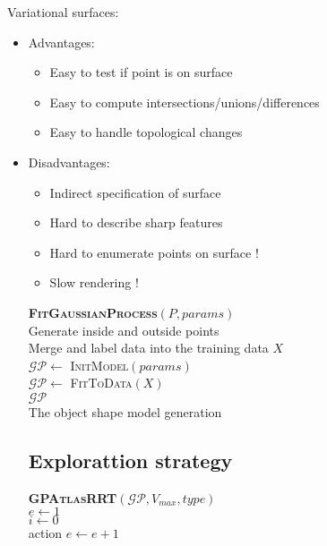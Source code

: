 Variational surfaces:
\begin{itemize}
\item Advantages:
\begin{itemize} 
\item Easy to test if point is on surface
\item Easy to compute intersections/unions/differences
\item Easy to handle topological changes
\end{itemize}
\item Disadvantages:
\begin{itemize}
\item Indirect specification of surface
\item Hard to describe sharp features
\item Hard to enumerate points on surface !
\item Slow rendering !
\end{itemize}

\begin{algorithm}[h]
\textbf{\textsc{FitGaussianProcess}}$(P, params)$\\ %
\LinesNumbered
\DontPrintSemicolon
\SetAlgoVlined {} 
  Generate inside and outside points \\
  Merge and label data into the training data $X$ \\
  $\mathcal{GP} \leftarrow$ \textsc{InitModel}$(params)$ \\
  $\mathcal{GP} \leftarrow$ \textsc{FitToData}$(X)$ \\
  \Return $\mathcal{GP}$ \\
\caption{The object shape model generation} \label{algo:strategy}
\end{algorithm}

\subsection{Explorattion strategy}
\label{sec:strategy}


\begin{algorithm}[h]
\textbf{\textsc{GPAtlasRRT}}$(\mathcal{GP}, V_{max}, type)$\\ %
\LinesNumbered
\DontPrintSemicolon
\SetAlgoVlined {} 
  $e \leftarrow 1$ \\
  {
    $i \leftarrow 0$ \\
    {
      \Return action 
    }
    $e \leftarrow e + 1$ \\
  }


\end{algorithm}
\end{itemize}
